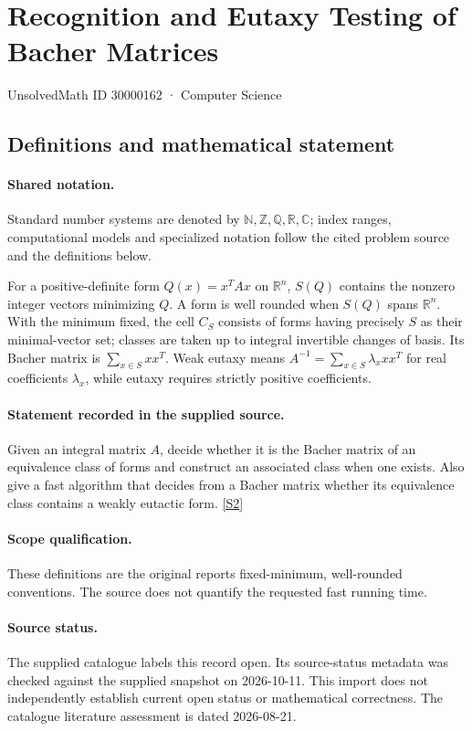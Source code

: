 \documentclass[11pt]{article}
\newcommand{\sref}[2]{\hyperlink{source:#1:#2}{[S#2]}}
\begin{document}
\setcounter{section}{30000161}
\section{Recognition and Eutaxy Testing of Bacher Matrices}\label{30000162}
{\small\sffamily UnsolvedMath ID 30000162 · Computer Science}
\subsection{Definitions and mathematical statement}

\paragraph{Shared notation.}Standard number systems are denoted by $\mathbb N,\mathbb Z,\mathbb Q,\mathbb R,\mathbb C$; index ranges, computational models and specialized notation follow the cited problem source and the definitions below.


For a positive-definite form $Q(x)=x^TAx$ on $\mathbb R^n$, $S(Q)$ contains the nonzero integer vectors minimizing $Q$. A form is well rounded when $S(Q)$ spans $\mathbb R^n$. With the minimum fixed, the cell $C_S$ consists of forms having precisely $S$ as their minimal-vector set; classes are taken up to integral invertible changes of basis. Its Bacher matrix is $\sum_{x\in S}xx^T$. Weak eutaxy means $A^{-1}=\sum_{x\in S}\lambda_xxx^T$ for real coefficients $\lambda_x$, while eutaxy requires strictly positive coefficients.
\paragraph{Statement recorded in the supplied source.}
Given an integral matrix $A$, decide whether it is the Bacher matrix of an equivalence class of forms and construct an associated class when one exists. Also give a fast algorithm that decides from a Bacher matrix whether its equivalence class contains a weakly eutactic form. \sref{30000162}{2}
\paragraph{Scope qualification.}
These definitions are the original report\textquotesingle s fixed-minimum, well-rounded conventions. The source does not quantify the requested fast running time.
\paragraph{Source status.}
The supplied catalogue labels this record open. Its source-status metadata was checked against the supplied snapshot on 2026-10-11. This import does not independently establish current open status or mathematical correctness. The catalogue literature assessment is dated 2026-08-21.
\end{document}
